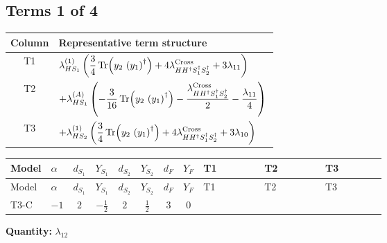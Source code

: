 \documentclass[8pt]{article}
\begin{document}
\begin{landscape}
\subsection*{Terms 1 of 4}
\begin{center}
\begin{tabular}{@{}c >{\raggedright\arraybackslash}p{0.82\linewidth}@{}}
\toprule
Column & Representative term structure \\
\midrule
T1 & \(\displaystyle {\lambda_{HS_1}^{(1)}} \left(\frac{3}{4} \operatorname{Tr}\!\left({y_2}\,\left({y_1}\right)^{\dagger}\right)+4 {\lambda_{H H^\dagger S_1^\dagger S_2^\dagger}^{\rm Cross}}+3 {\lambda_{11}}\right)\) \\
\midrule
T2 & \(\displaystyle +{\lambda_{HS_1}^{(A)}} \left(-\frac{3}{16} \operatorname{Tr}\!\left({y_2}\,\left({y_1}\right)^{\dagger}\right)-\frac{{\lambda_{H H^\dagger S_1^\dagger S_2^\dagger}^{\rm Cross}}}{2}-\frac{{\lambda_{11}}}{4}\right)\) \\
\midrule
T3 & \(\displaystyle +{\lambda_{HS_2}^{(1)}} \left(\frac{3}{4} \operatorname{Tr}\!\left({y_2}\,\left({y_1}\right)^{\dagger}\right)+4 {\lambda_{H H^\dagger S_1^\dagger S_2^\dagger}^{\rm Cross}}+3 {\lambda_{10}}\right)\) \\
\midrule
\bottomrule
\end{tabular}
\end{center}
\smallskip
\tiny
\begin{longtable}{@{}llcccccc >{\raggedright\arraybackslash}p{0.21\linewidth} >{\raggedright\arraybackslash}p{0.21\linewidth} >{\raggedright\arraybackslash}p{0.21\linewidth}@{}}
\toprule
Model & $\alpha$ & $d_{S_1}$ & $Y_{S_1}$ & $d_{S_2}$ & $Y_{S_2}$ & $d_F$ & $Y_F$ & T1 & T2 & T3 \\
\midrule
\endfirsthead
\toprule
Model & $\alpha$ & $d_{S_1}$ & $Y_{S_1}$ & $d_{S_2}$ & $Y_{S_2}$ & $d_F$ & $Y_F$ & T1 & T2 & T3 \\
\midrule
\endhead
T3-C & $-1$ & $2$ & $-\frac{1}{2}$ & $2$ & $\frac{1}{2}$ & $3$ & $0$ & \scriptsize\adjustbox{max width=\linewidth}{$\begin{gathered} {\lambda_{HS_1}^{(1)}} \left(\frac{3}{4} \operatorname{Tr}\!\left({y_2}\,\left({y_1}\right)^{\dagger}\right)+4 {\lambda_{H H^\dagger S_1^\dagger S_2^\dagger}^{\rm Cross}}+3 {\lambda_{11}}\right)\end{gathered}$} & \scriptsize\adjustbox{max width=\linewidth}{$\begin{gathered} +{\lambda_{HS_1}^{(A)}} \left(-\frac{3}{16} \operatorname{Tr}\!\left({y_2}\,\left({y_1}\right)^{\dagger}\right)-\frac{{\lambda_{H H^\dagger S_1^\dagger S_2^\dagger}^{\rm Cross}}}{2}-\frac{{\lambda_{11}}}{4}\right)\end{gathered}$} & \scriptsize\adjustbox{max width=\linewidth}{$\begin{gathered} +{\lambda_{HS_2}^{(1)}} \left(\frac{3}{4} \operatorname{Tr}\!\left({y_2}\,\left({y_1}\right)^{\dagger}\right)+4 {\lambda_{H H^\dagger S_1^\dagger S_2^\dagger}^{\rm Cross}}+3 {\lambda_{10}}\right)\end{gathered}$} \\
\midrule
\bottomrule
\end{longtable}
\clearpage
\noindent\textbf{Quantity: }$\lambda_{12}$\par\smallskip

\end{landscape}
\end{document}
